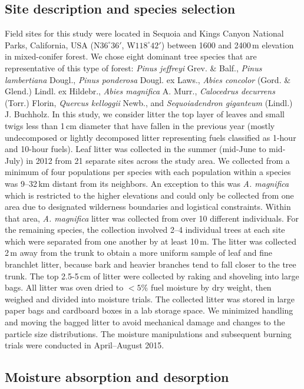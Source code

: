 \documentclass[letterpaper,12pt]{article}
\begin{document}
\subsection*{Site description and species selection}

Field sites for this study were located in Sequoia and Kings Canyon National
Parks, California, USA (N$36^\circ 36'$, W$118^\circ 42'$) between 1600 and
2400\,m elevation in mixed-conifer forest. We chose eight dominant tree species
that are representative of this type of forest: \emph{Pinus jeffreyi} Grev. \&
Balf., \emph{Pinus lambertiana} Dougl., \emph{Pinus ponderosa} Dougl. ex Laws.,
\emph{Abies concolor} (Gord. \& Glend.) Lindl. ex Hildebr., \emph{Abies
  magnifica} A. Murr., \emph{Calocedrus decurrens} (Torr.) Florin,
\emph{Quercus kelloggii} Newb., and \emph{Sequoiadendron giganteum} (Lindl.) J.
Buchholz. In this study, we consider litter the top layer of leaves and small
twigs less than 1\,cm diameter that have fallen in the previous year (mostly
undecomposed or lightly decomposed litter representing fuels classified as
1-hour and 10-hour fuels). Leaf litter was collected in the summer (mid-June to
mid-July) in 2012 from 21 separate sites across the study area. We collected
from a minimum of four populations per species with each population within a
species was 9--32\,km distant from its neighbors. An exception to this was
\emph{A. magnifica} which is restricted to the higher elevations and could only
be collected from one area due to designated wilderness boundaries and
logistical constraints. Within that area, \emph{A. magnifica} litter was
collected from over 10 different individuals. For the remaining species, the
collection involved 2--4 individual trees at each site which were separated
from one another by at least 10\,m. The litter was collected 2\,m away from the
trunk to obtain a more uniform sample of leaf and fine branchlet litter,
because bark and heavier branches tend to fall closer to the tree trunk. The
top 2.5-5\,cm of litter were collected by raking and shoveling into large bags.
All litter was oven dried to $< 5$\% fuel moisture by dry weight, then weighed
and divided into moisture trials. The collected litter was stored in large
paper bags and cardboard boxes in a lab storage space. We minimized handling
and moving the bagged litter to avoid mechanical damage and changes to the
particle size distributions. The moisture manipulations and subsequent burning
trials were conducted in April--August 2015.

\subsection*{Moisture absorption and desorption}
\end{document}
